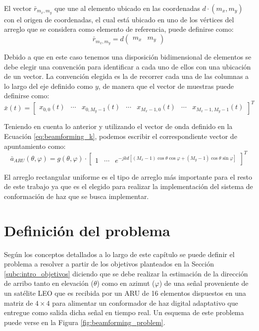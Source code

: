 El vector $\bar{r}_{m_x,m_y}$ que une al elemento ubicado en las coordenadas $d\cdot(m_x,m_y)$ con el origen de coordenadas, el cual está ubicado en uno de los vértices del arreglo que se considera como elemento de referencia, puede definirse como:
\begin{equation}
    \bar{r}_{m_x,m_y} = d \begin{pmatrix}
        m_x & m_y
    \end{pmatrix}
\end{equation}

Debido a que en este caso tenemos una disposición bidimensional de elementos se debe elegir una convención para identificar a cada uno de ellos con una ubicación de un vector. La convención elegida es la de recorrer cada una de las columnas a lo largo del eje definido como $y$, de manera que el vector de muestras puede definirse como:
\begin{equation}
    \bar{x}(t)= \begin{bmatrix}
        x_{0,0}(t) & \cdots & x_{0,M_y-1}(t) & \cdots & x_{M_x-1,0}(t) & \cdots & x_{M_x-1,M_y-1}(t)
    \end{bmatrix}^T
\end{equation}

Teniendo en cuenta lo anterior y utilizando el vector de onda definido en la Ecuación \ref{eq:beamforming_k}, podemos escribir el correspondiente vector de apuntamiento como:
\begin{equation}
    \bar{a}_{ARU}(\theta,\varphi) = g(\theta,\varphi) \cdot \begin{bmatrix}
        1 & \cdots & e^{-jkd[(M_x-1)\cos\theta\cos\varphi+(M_y-1)\cos\theta\sin\varphi]}
    \end{bmatrix}^T
    \label{eq:beamforming_a_aru}
\end{equation}

El arreglo rectangular uniforme es el tipo de arreglo más importante para el resto de este trabajo ya que es el elegido para realizar la implementación del sistema de conformación de haz que se busca implementar.

\section{Definición del problema}\label{subc:beamforming_problem}
Según los conceptos detallados a lo largo de este capítulo se puede definir el problema a resolver a partir de los objetivos planteados en la Sección \ref{subc:intro_objetivos} diciendo que se debe realizar la estimación de la dirección de arribo tanto en elevación ($\theta$) como en azimut ($\varphi$) de una señal proveniente de un satélite LEO que es recibida por un ARU de 16 elementos dispuestos en una matriz de $4\times 4$ para alimentar un conformador de haz digital adaptativo que entregue como salida dicha señal en tiempo real. Un esquema de este problema puede verse en la Figura \ref{fig:beamforming_problem}.

